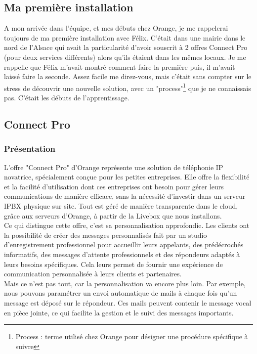 \documentclass[12pt, a4paper]{article}
\begin{document}
\subsection{Ma première installation}
A mon arrivée dans l'équipe, et mes débuts chez Orange, 
je me rappelerai toujours de ma première installation 
avec Félix. C'était dans une mairie dans le nord
de l'Alsace qui avait la particularité d'avoir 
souscrit à 2 offres Connect Pro (pour deux services différents) 
alors qu'ils étaient dans les mêmes locaux. Je me rappelle que Félix m'avait
montré comment faire la première puis, il m'avait laissé
faire la seconde. Assez facile me direz-vous, mais
c'était sans compter sur le stress de découvrir 
une nouvelle solution, avec un "process"\footnote{Process : terme utilisé chez Orange pour désigner une procédure spécifique à suivre} que je ne connaissais 
pas. C'était les débuts de l'apprentissage. 

\subsection{Connect Pro}
\subsubsection{Présentation}
L'offre "Connect Pro" d'Orange représente une solution
de téléphonie IP novatrice, spécialement conçue pour
les petites entreprises. Elle offre la flexibilité et
la facilité d'utilisation dont ces entreprises ont
besoin pour gérer leurs communications de manière
efficace, sans la nécessité d'investir dans un
serveur IPBX physique sur site. Tout est géré de
manière transparente dans le cloud, grâce aux
serveurs d'Orange, à partir de la Livebox
que nous installons.\\

Ce qui distingue cette offre, c'est sa
personnalisation approfondie. Les clients ont
la possibilité de créer des messages personnalisés 
fait par un studio d'enregistrement professionnel 
pour accueillir leurs appelants, des prédécrochés
informatifs, des messages d'attente professionnels
et des répondeurs adaptés à leurs besoins spécifiques.
Cela leurs permet de fournir une expérience de
communication personnalisée à leurs clients
et partenaires.\\

Mais ce n'est pas tout, car la personnalisation
va encore plus loin. Par exemple, nous
pouvons paramétrer un envoi automatique de
mails à chaque fois qu'un message est déposé sur
le répondeur. Ces mails peuvent contenir le
message vocal en pièce jointe, ce qui
facilite la gestion et le suivi des messages importants.\\
\end{document}
